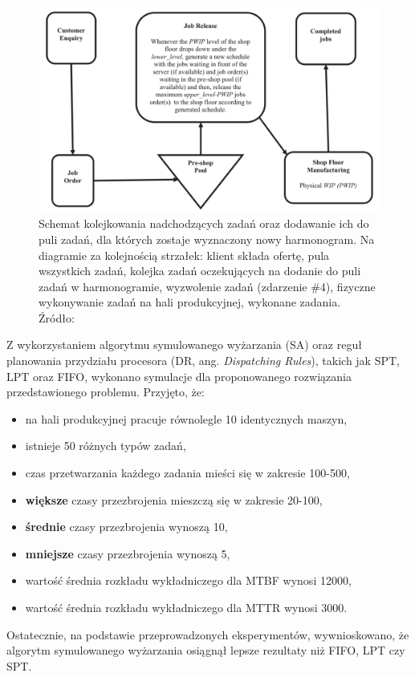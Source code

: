 \documentclass[printmode,oneside]{mgr}
\begin{document}
\begin{figure}[!ht]
\begin{center}
\includegraphics[scale=1.0,width=16cm]{rysunki/kolejkowanie_na_serwerze.png}
\caption[Schemat kolejkowania nadchodzących zadań oraz dodawanie ich do puli zadań, dla których zostaje wyznaczony nowy harmonogram]{Schemat kolejkowania nadchodzących zadań oraz dodawanie ich do puli zadań, dla których zostaje wyznaczony nowy harmonogram. Na diagramie za kolejnością strzałek: klient składa ofertę, pula wszystkich zadań, kolejka zadań oczekujących na dodanie do puli zadań w harmonogramie, wyzwolenie zadań (zdarzenie \#4), fizyczne wykonywanie zadań na hali produkcyjnej, wykonane zadania. Źródło: \protect\cite{EDSBCR}}
\label{rys_kolejkowanie_na_serwerze}
\end{center}
\end{figure}
Z wykorzystaniem algorytmu symulowanego wyżarzania (SA) oraz reguł planowania przydziału procesora (DR, ang. \emph{Dispatching Rules}), takich jak SPT, LPT oraz FIFO, wykonano symulacje dla proponowanego rozwiązania przedstawionego problemu. Przyjęto, że:
\begin{itemize}
    \item na hali produkcyjnej pracuje równolegle 10 identycznych maszyn,
    \item istnieje 50 różnych typów zadań,
    \item czas przetwarzania każdego zadania mieści się w zakresie 100-500,
    \item \textbf{większe} czasy przezbrojenia mieszczą się w zakresie 20-100,
    \item \textbf{średnie} czasy przezbrojenia wynoszą 10,
    \item \textbf{mniejsze} czasy przezbrojenia wynoszą 5,
    \item wartość średnia rozkładu wykładniczego dla MTBF wynosi 12000,
    \item wartość średnia rozkładu wykładniczego dla MTTR wynosi 3000.
\end{itemize}
Ostatecznie, na podstawie przeprowadzonych eksperymentów, wywnioskowano, że algorytm symulowanego wyżarzania osiągnął lepsze rezultaty niż FIFO, LPT czy SPT.
%
\end{document}
